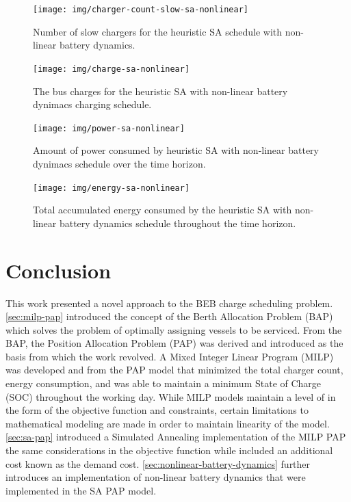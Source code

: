 \documentclass[ee,thesis]{usuthesis}
\begin{document}
\begin{figure}[h]
  \centering
  \texttt{[image: img/charger-count-slow-sa-nonlinear]}
  \caption{Number of slow chargers for the heuristic SA schedule with non-linear battery dynamics.}
  \label{subfig:slow-charger-usage-nonlinear-sa}
\end{figure}

\begin{figure}[h]
  \texttt{[image: img/charge-sa-nonlinear]}
  \caption{The bus charges for the heuristic SA with non-linear battery dynimacs charging schedule.}
  \label{subfig:nonlinear-sa-charge}
\end{figure}

\begin{figure}[h]
  \centering
  \texttt{[image: img/power-sa-nonlinear]}
  \caption{Amount of power consumed by heuristic SA with non-linear battery dynimacs schedule over the time horizon.}
  \label{fig:power-usage-nonlinear-sa}
  \label{fig:power}
\end{figure}

\begin{figure}[htpb]
\centering \texttt{[image: img/energy-sa-nonlinear]}
    \caption{Total accumulated energy consumed by the heuristic SA with non-linear battery dynamics schedule throughout the time horizon.}
    \label{fig:energy-usage-nonlinear-sa}
\end{figure}

\chapter{Conclusion}
\label{sec:conclusion}
This work presented a novel approach to the BEB charge scheduling problem. \ref{sec:milp-pap} introduced the concept of the
Berth Allocation Problem (BAP) which solves the problem of optimally assigning vessels to be serviced. From the BAP, the
Position Allocation Problem (PAP) was derived and introduced as the basis from which the work revolved. A Mixed Integer
Linear Program (MILP) was developed and from the PAP model that minimized the total charger count, energy consumption,
and was able to maintain a minimum State of Charge (SOC) throughout the working day. While MILP models maintain a level
of in the form of the objective function and constraints, certain limitations to mathematical modeling are made in order
to maintain linearity of the model. \ref{sec:sa-pap} introduced a Simulated Annealing implementation of the MILP PAP the same
considerations in the objective function while included an additional cost known as the demand cost.
\ref{sec:nonlinear-battery-dynamics} further introduces an implementation of non-linear battery dynamics that were
implemented in the SA PAP model.
\end{document}
